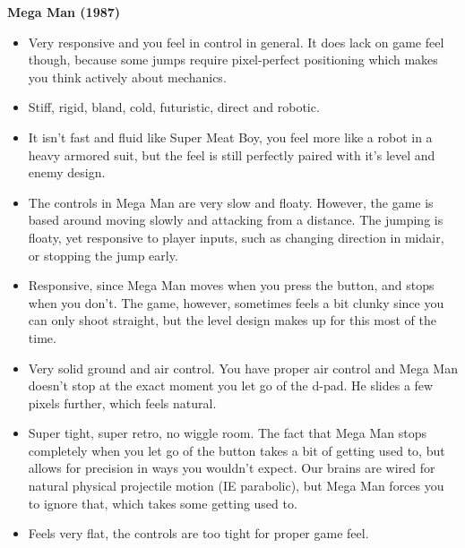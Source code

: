 \textbf{Mega Man (1987)}
\vspace{-5mm}
\begin{itemize}[noitemsep,nolistsep]
\item Very responsive and you feel in control in general. It does lack on game feel though, because some jumps require pixel-perfect positioning which makes you think actively about mechanics.
\item Stiff, rigid, bland, cold, futuristic, direct and robotic.
\item It isn't fast and fluid like Super Meat Boy, you feel more like a robot in a heavy armored suit, but the feel is still perfectly paired with it's level and enemy design.
\item The controls in Mega Man are very slow and floaty. However, the game is based around moving slowly and attacking from a distance. The jumping is floaty, yet responsive to player inputs, such as changing direction in midair, or stopping the jump early. 
\item Responsive, since Mega Man moves when you press the button, and stops when you don't. The game, however, sometimes feels a bit clunky since you can only shoot straight, but the level design makes up for this most of the time.
\item Very solid ground and air control. You have proper air control and Mega Man doesn't stop at the exact moment you let go of the d-pad. He slides a few pixels further, which feels natural.
\item Super tight, super retro, no wiggle room. The fact that Mega Man stops completely when you let go of the button takes a bit of getting used to, but allows for precision in ways you wouldn't expect. Our brains are wired for natural physical projectile motion (IE parabolic), but Mega Man forces you to ignore that, which takes some getting used to.
\item Feels very flat, the controls are too tight for proper game feel.
\end{itemize}

